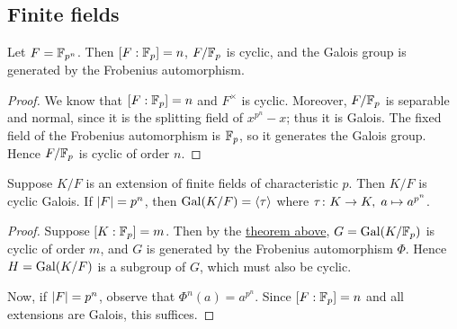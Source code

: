 
\subsection*{Finite fields}

\begin{theorem}\label{thm:finite-field-cyclic-galois}
    Let \(F = \mathbb{F}_{p^n}\).
    Then \([F:\mathbb{F}_p] = n\), \(F/\mathbb{F}_p\) is cyclic,
    and the Galois group is generated by the Frobenius automorphism.
\end{theorem}
\begin{proof}
    We know that \([F:\mathbb{F}_p] = n\) and \(F^\times\) is cyclic.
    Moreover, \(F/\mathbb{F}_p\) is separable and normal, since it is the splitting field of \(x^{p^n} - x\);
    thus it is Galois.
    The fixed field of the Frobenius automorphism is \(\mathbb{F}_p\),
    so it generates the Galois group.
    Hence \(F/\mathbb{F}_p\) is cyclic of order \(n\).
\end{proof}
\begin{corollary}\label{cor:cyclic-galois-frobenius}
    Suppose \(K/F\) is an extension of finite fields of characteristic \(p\).
    Then \(K/F\) is cyclic Galois.
    If \(\abs{F} = p^n\), then \(\operatorname{Gal}(K/F) = \langle\tau\rangle\)
    where \(\tau\colon K\to K,\;a\mapsto a^{p^n}\).
\end{corollary}
\begin{proof}
    Suppose \([K:\mathbb{F}_p] = m\).
    Then by the \hyperref[thm:finite-field-cyclic-galois]{theorem above},
    \(G = \operatorname{Gal}(K/\mathbb{F}_p)\) is cyclic of order \(m\),
    and \(G\) is generated by the Frobenius automorphism \(\Phi\).
    Hence \(H = \operatorname{Gal}(K/F)\) is a subgroup of \(G\), which must also be cyclic.

    Now, if \(\abs{F} = p^n\), observe that \(\Phi^n(a) = a^{p^n}\).
    Since \([F:\mathbb{F}_p] = n\) and all extensions are Galois, this suffices.
\end{proof}

